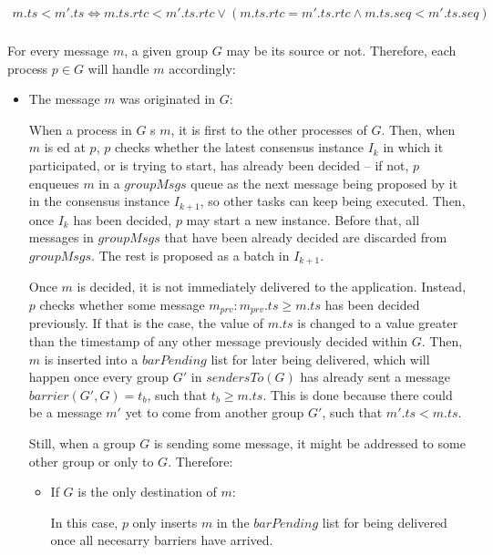 \documentclass[times, 10pt]{article}
\begin{document}
\begin{align*}
m.ts < m'.ts \Longleftrightarrow m.ts.rtc < m'.ts.rtc \vee (m.ts.rtc = m'.ts.rtc \wedge m.ts.seq < m'.ts.seq)\\
\end{align*}

For every message $m$, a given group $G$ may be its source or not. Therefore, each process $p \in G$ will handle $m$ accordingly:

\begin{itemize}
  \item The message $m$ was originated in $G$:
  
  When a process in $G$ \amcast{}s $m$, it is first \rmcast{} to the other processes of $G$. Then, when $m$ is \rmdel{}ed at $p$, $p$ checks whether the latest consensus instance $I_{k}$ in which it participated, or is trying to start, has already been decided -- if not, $p$ enqueues $m$ in a $groupMsgs$ queue as the next message being proposed by it in the consensus instance $I_{k+1}$, so other tasks can keep being executed. Then, once $I_{k}$ has been decided, $p$ may start a new instance. Before that, all messages in $groupMsgs$ that have been already decided are discarded from $groupMsgs$. The rest is proposed as a batch in $I_{k+1}$.
  
  Once $m$ is decided, it is not immediately delivered to the application. Instead, $p$ checks whether some message $m_{prv} : m_{prv}.ts \geq m.ts$ has been decided previously. If that is the case, the value of $m.ts$ is changed to a value greater than the timestamp of any other message previously decided within $G$. Then, $m$ is inserted into a $barPending$ list for later being delivered, which will happen once every group $G'$ in $sendersTo(G)$ has already sent a message $barrier(G',G) = t_b$, such that $t_b \geq m.ts$. This is done because there could be a message $m'$ yet to come from another group $G'$, such that $m'.ts < m.ts$.
  
  Still, when a group $G$ is sending some message, it might be addressed to some other group or only to $G$. Therefore:
  
  \begin{itemize}
    \item If $G$ is the only destination of $m$:
    
    In this case, $p$ only inserts $m$ in the $barPending$ list for being delivered once all necesarry barriers have arrived.
    

\end{itemize}
\end{itemize}
\end{document}
